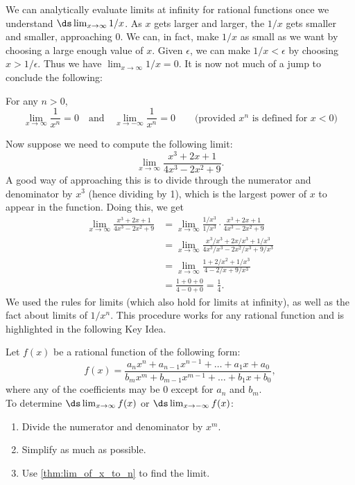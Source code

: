 
We can analytically evaluate limits at infinity for rational functions once we understand $\ds\lim_{x\rightarrow\infty} 1/x$.  As $x$ gets larger and larger, the $1/x$ gets smaller and smaller, approaching 0.  We can, in fact, make $1/x$ as small as we want by choosing a large enough value of $x$.  Given $\epsilon$, we can make $1/x<\epsilon$  by choosing $x>1/\epsilon$.  Thus we have $\lim_{x\rightarrow\infty} 1/x=0$.  
It is now not much of a jump to conclude the following:

{
\begin{theorem}\label{thm:lim_of_x_to_n}%
For any $n>0$, 
\[
\lim_{x\to\infty}\frac{1}{x^n}=0
\quad\text{and}\quad
\lim_{x\to-\infty}\frac{1}{x^n}=0
\qquad\text{(provided $x^n$ is defined for $x<0$)}
\]
\end{theorem}}


Now suppose we need to compute the following limit:
\[\lim_{x\rightarrow\infty}\frac{x^3+2x+1}{4x^3-2x^2+9}.\]
A good way of approaching this is to divide through the numerator and denominator by $x^3$ (hence dividing by 1), which is the largest power of $x$ to appear in the function.  Doing this, we get
\begin{align*}
\lim_{x\to\infty}\frac{x^3+2x+1}{4x^3-2x^2+9} &=
\lim_{x\to\infty}\frac{1/x^3}{1/x^3}\cdot\frac{x^3+2x+1}{4x^3-2x^2+9}\\ &=\lim_{x\to\infty}\frac{x^3/x^3+2x/x^3+1/x^3}{4x^3/x^3-2x^2/x^3+9/x^3}\\ &= \lim_{x\to\infty}\frac{1+2/x^2+1/x^3}{4-2/x+9/x^3}\\
&=\frac{1+0+0}{4-0+0}=\frac14.
\end{align*}
We used the rules for limits (which also hold for limits at infinity), as well as the fact about limits of $1/x^n$. This procedure works for any rational function and is highlighted in the following Key Idea.

\begin{keyidea}\label{key:rat_lim_at_inf}%
Let $f(x)$ be a rational function of the following form:
\[
f(x)
=\frac{a_nx^n + a_{n-1}x^{n-1}+\dots + a_1x + a_0}
{b_mx^m + b_{m-1}x^{m-1} + \dots + b_1x + b_0},
\]
where any of the coefficients may be 0 except for $a_n$ and $b_m$.\\
To determine $\ds\lim_{x\to \infty}f(x)$ or $\ds\lim_{x\to-\infty}f(x)$:
\begin{enumerate}
\item Divide the numerator and denominator by $x^m$.
\item Simplify as much as possible.
\item Use \autoref{thm:lim_of_x_to_n} to find the limit.
\end{enumerate}
\end{keyidea}

